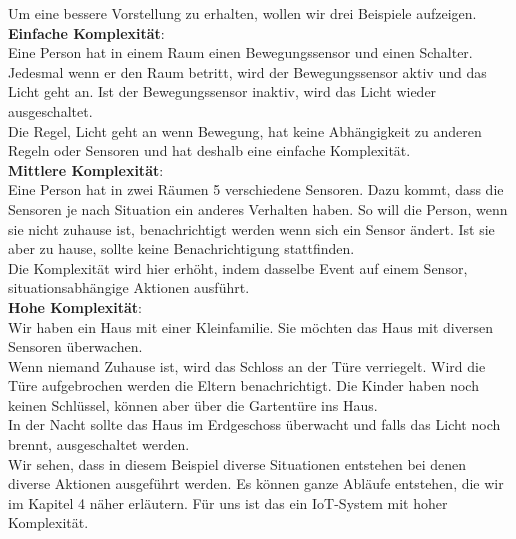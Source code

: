 Um eine bessere Vorstellung zu erhalten, wollen wir drei Beispiele aufzeigen.\\[2ex]
\textbf{Einfache Komplexität}:\\
Eine Person hat in einem Raum einen Bewegungssensor und einen Schalter. Jedesmal wenn er den Raum betritt, wird der Bewegungssensor aktiv und das Licht geht an. Ist der Bewegungssensor inaktiv, wird das Licht wieder ausgeschaltet.\\
Die Regel, Licht geht an wenn Bewegung, hat keine Abhängigkeit zu anderen Regeln oder Sensoren und hat deshalb eine einfache Komplexität.\\[2ex]
\textbf{Mittlere Komplexität}:\\
Eine Person hat in zwei Räumen 5 verschiedene Sensoren. Dazu kommt, dass die Sensoren je nach Situation ein anderes Verhalten haben. So will die Person, wenn sie nicht zuhause ist, benachrichtigt werden wenn sich ein Sensor ändert. Ist sie aber zu hause, sollte keine Benachrichtigung stattfinden.\\
Die Komplexität wird hier erhöht, indem dasselbe Event auf einem Sensor, situationsabhängige Aktionen ausführt.\\[2ex]
\textbf{Hohe Komplexität}:\\
Wir haben ein Haus mit einer Kleinfamilie. Sie möchten das Haus mit diversen Sensoren überwachen.\\
Wenn niemand Zuhause ist, wird das Schloss an der Türe verriegelt. Wird die Türe aufgebrochen werden die Eltern benachrichtigt. Die Kinder haben noch keinen Schlüssel, können aber über die Gartentüre ins Haus.\\
In der Nacht sollte das Haus im Erdgeschoss überwacht und falls das Licht noch brennt, ausgeschaltet werden.\\
Wir sehen, dass in diesem Beispiel diverse Situationen entstehen bei denen diverse Aktionen ausgeführt werden. Es können ganze Abläufe entstehen, die wir im Kapitel 4 näher erläutern. Für uns ist das ein IoT-System mit hoher Komplexität.\\[2ex]